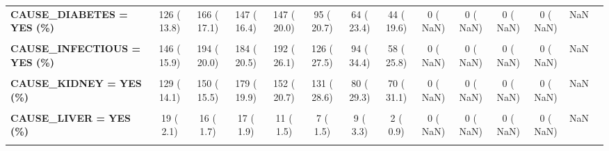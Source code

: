\documentclass[
]{article}
\begin{document}
\begin{table}[H]
\begin{tabular}[t]{>{\raggedright\arraybackslash}p{5em}ccccccccccccc}
\textbf{CAUSE\_DIABETES = YES (\%)} & 126 ( 13.8) & 166 ( 17.1) & 147 ( 16.4) & 147 ( 20.0) & 95 ( 20.7) & 64 ( 23.4) & 44 ( 19.6) & 0 (  NaN) & 0 (  NaN) & 0 (  NaN) & 0 (  NaN) & NaN & \\
\textbf{\cellcolor{gray!10}{CAUSE\_HEART = YES (\%)}} & \cellcolor{gray!10}{546 ( 59.6)} & \cellcolor{gray!10}{638 ( 65.8)} & \cellcolor{gray!10}{587 ( 65.3)} & \cellcolor{gray!10}{502 ( 68.2)} & \cellcolor{gray!10}{354 ( 77.3)} & \cellcolor{gray!10}{200 ( 73.3)} & \cellcolor{gray!10}{166 ( 73.8)} & \cellcolor{gray!10}{0 (  NaN)} & \cellcolor{gray!10}{0 (  NaN)} & \cellcolor{gray!10}{0 (  NaN)} & \cellcolor{gray!10}{0 (  NaN)} & \cellcolor{gray!10}{NaN} & \cellcolor{gray!10}{}\\
\textbf{CAUSE\_INFECTIOUS = YES (\%)} & 146 ( 15.9) & 194 ( 20.0) & 184 ( 20.5) & 192 ( 26.1) & 126 ( 27.5) & 94 ( 34.4) & 58 ( 25.8) & 0 (  NaN) & 0 (  NaN) & 0 (  NaN) & 0 (  NaN) & NaN & \\
\textbf{\cellcolor{gray!10}{CAUSE\_INFLUENZA = YES (\%)}} & \cellcolor{gray!10}{64 (  7.0)} & \cellcolor{gray!10}{61 (  6.3)} & \cellcolor{gray!10}{60 (  6.7)} & \cellcolor{gray!10}{64 (  8.7)} & \cellcolor{gray!10}{37 (  8.1)} & \cellcolor{gray!10}{22 (  8.1)} & \cellcolor{gray!10}{23 ( 10.2)} & \cellcolor{gray!10}{0 (  NaN)} & \cellcolor{gray!10}{0 (  NaN)} & \cellcolor{gray!10}{0 (  NaN)} & \cellcolor{gray!10}{0 (  NaN)} & \cellcolor{gray!10}{NaN} & \cellcolor{gray!10}{}\\
\textbf{CAUSE\_KIDNEY = YES (\%)} & 129 ( 14.1) & 150 ( 15.5) & 179 ( 19.9) & 152 ( 20.7) & 131 ( 28.6) & 80 ( 29.3) & 70 ( 31.1) & 0 (  NaN) & 0 (  NaN) & 0 (  NaN) & 0 (  NaN) & NaN & \\
\textbf{\cellcolor{gray!10}{CAUSE\_LAW = NO (\%)}} & \cellcolor{gray!10}{916 (100.0)} & \cellcolor{gray!10}{969 (100.0)} & \cellcolor{gray!10}{899 (100.0)} & \cellcolor{gray!10}{736 (100.0)} & \cellcolor{gray!10}{458 (100.0)} & \cellcolor{gray!10}{273 (100.0)} & \cellcolor{gray!10}{225 (100.0)} & \cellcolor{gray!10}{0 (  NaN)} & \cellcolor{gray!10}{0 (  NaN)} & \cellcolor{gray!10}{0 (  NaN)} & \cellcolor{gray!10}{0 (  NaN)} & \cellcolor{gray!10}{NA} & \cellcolor{gray!10}{}\\
\textbf{CAUSE\_LIVER = YES (\%)} & 19 (  2.1) & 16 (  1.7) & 17 (  1.9) & 11 (  1.5) & 7 (  1.5) & 9 (  3.3) & 2 (  0.9) & 0 (  NaN) & 0 (  NaN) & 0 (  NaN) & 0 (  NaN) & NaN & \\
\textbf{\cellcolor{gray!10}{CAUSE\_MURDER = YES (\%)}} & \cellcolor{gray!10}{0 (  0.0)} & \cellcolor{gray!10}{1 (  0.1)} & \cellcolor{gray!10}{1 (  0.1)} & \cellcolor{gray!10}{2 (  0.3)} & \cellcolor{gray!10}{0 (  0.0)} & \cellcolor{gray!10}{0 (  0.0)} & \cellcolor{gray!10}{0 (  0.0)} & \cellcolor{gray!10}{0 (  NaN)} & \cellcolor{gray!10}{0 (  NaN)} & \cellcolor{gray!10}{0 (  NaN)} & \cellcolor{gray!10}{0 (  NaN)} & \cellcolor{gray!10}{NaN} & \cellcolor{gray!10}{}\\

\end{tabular}
\end{table}
\end{document}
